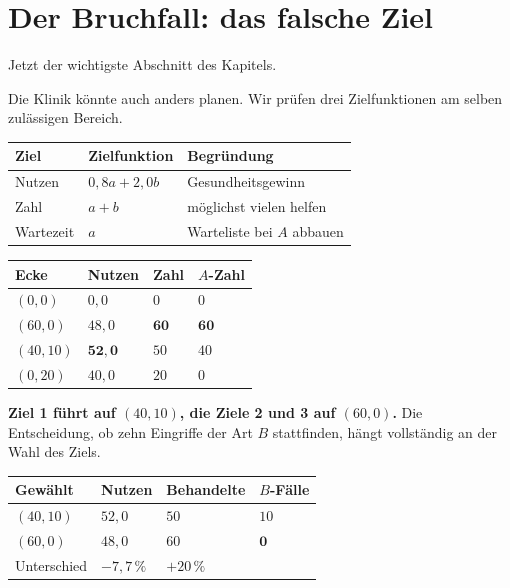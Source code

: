\section{Der Bruchfall: das falsche Ziel}

Jetzt der wichtigste Abschnitt des Kapitels.

\begin{warnung}
Die Klinik könnte auch anders planen. Wir prüfen drei Zielfunktionen am selben zulässigen Bereich.

\begin{center}
{\small
\renewcommand{\arraystretch}{1.5}
\begin{tabular}{@{}P{2.2cm}P{2.8cm}P{3.0cm}@{}}
\toprule
\textbf{Ziel} & \textbf{Zielfunktion} & \textbf{Begründung}\\
\midrule
Nutzen & $0{,}8a + 2{,}0b$ & Gesundheits\-gewinn\\
Zahl & $a + b$ & möglichst vielen helfen\\
Wartezeit & $a$ & Warteliste bei $A$ abbauen\\
\bottomrule
\end{tabular}}
\end{center}

\begin{center}
{\small
\renewcommand{\arraystretch}{1.48}
\begin{tabular}{@{}P{1.8cm}P{1.8cm}P{1.6cm}P{1.8cm}@{}}
\toprule
\textbf{Ecke} & \textbf{Nutzen} & \textbf{Zahl} & \textbf{$A$-Zahl}\\
\midrule
$(0,0)$ & $0{,}0$ & $0$ & $0$\\
$(60,0)$ & $48{,}0$ & $\mathbf{60}$ & $\mathbf{60}$\\
$(40,10)$ & $\mathbf{52{,}0}$ & $50$ & $40$\\
$(0,20)$ & $40{,}0$ & $20$ & $0$\\
\bottomrule
\end{tabular}}
\end{center}

\begin{center}
\begin{minipage}{0.9\textwidth}
\textbf{Ziel 1 führt auf $(40,10)$, die Ziele 2 und 3 auf $(60,0)$.} Die Entscheidung, ob zehn Eingriffe der Art $B$ stattfinden, hängt vollständig an der Wahl des Ziels.
\end{minipage}
\end{center}

\begin{center}
{\small
\renewcommand{\arraystretch}{1.48}
\begin{tabular}{@{}P{2.4cm}P{2.2cm}P{2.2cm}P{1.8cm}@{}}
\toprule
\textbf{Gewählt} & \textbf{Nutzen} & \textbf{Behandelte} & \textbf{$B$-Fälle}\\
\midrule
$(40,10)$ & $52{,}0$ & $50$ & $10$\\
$(60,0)$ & $48{,}0$ & $60$ & $\mathbf{0}$\\
\midrule
Unterschied & $-7{,}7\,\%$ & $+20\,\%$ & \\
\bottomrule
\end{tabular}}
\end{center}


\end{warnung}

